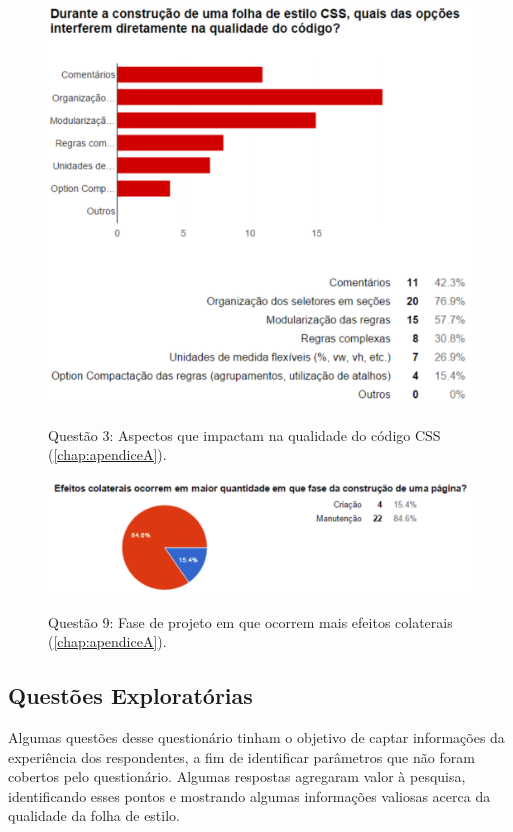 \begin{figure}[H]
	\centering
	\caption{Questão 3: Aspectos que impactam na qualidade do código CSS (\autoref{chap:apendiceA}).}
	\includegraphics[width=1\textwidth]{./04-figuras/questionario_q3}
	\label{fig:questionario_q3}
\end{figure}

\begin{figure}[H]
	\centering
	\caption{Questão 9: Fase de projeto em que ocorrem mais efeitos colaterais (\autoref{chap:apendiceA}).}
	\includegraphics[width=1\textwidth]{./04-figuras/questionario_q9}
	\label{fig:questionario_q9}
\end{figure}

\subsection{Questões Exploratórias}

Algumas questões desse questionário tinham o objetivo de captar informações da experiência dos respondentes, a fim de identificar parâmetros que não foram cobertos pelo questionário. Algumas respostas agregaram valor à pesquisa, identificando esses pontos e mostrando algumas informações valiosas acerca da qualidade da folha de estilo. 

